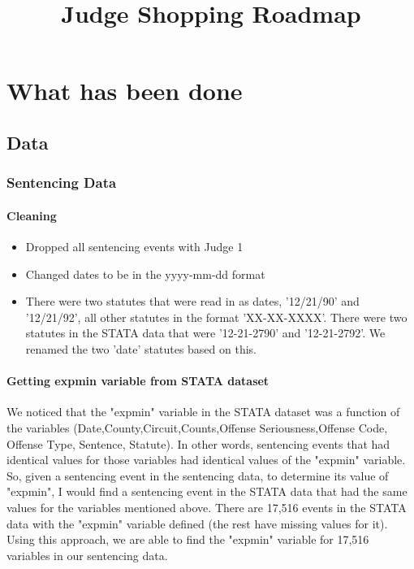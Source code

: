 \documentclass[11pt]{article}
\title{Judge Shopping Roadmap}
\begin{document}
\maketitle
\tableofcontents

\section{What has been done}
  \subsection{Data}
    \subsubsection{Sentencing Data}
      \paragraph{Cleaning}
        \begin{itemize}
          \item Dropped all sentencing events with Judge 1
          \item Changed dates to be in the yyyy-mm-dd format
          \item There were two statutes that were read in as dates, '12/21/90' and '12/21/92',
          all other statutes in the format 'XX-XX-XXXX'. There were two statutes in the STATA
          data that were '12-21-2790' and '12-21-2792'. We renamed the two 'date' statutes
          based on this.
        \end{itemize}

      \paragraph{Getting expmin variable from STATA dataset}
        We noticed that the "expmin" variable in the STATA dataset was a function
        of the variables (Date,County,Circuit,Counts,Offense Seriousness,Offense Code,
        Offense Type, Sentence, Statute). In other words, sentencing events that had
        identical values for those variables had identical values of the "expmin" variable.
        So, given a sentencing event in the sentencing data, to determine its value of "expmin",
        I would find a sentencing event in the STATA data that had the same values for the
        variables mentioned above. There are 17,516 events in the STATA data with the "expmin"
        variable defined (the rest have missing values for it). Using this approach, we are able to find the "expmin" variable for
        17,516 variables in our sentencing data.
\end{document}
